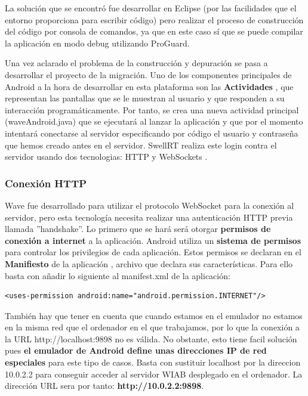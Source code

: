 	La solución que se encontró fue desarrollar en Eclipse (por las facilidades que el entorno proporciona para escribir código) pero realizar el proceso de construcción del código por consola de comandos, ya que en este caso sí que se puede compilar la aplicación en modo debug utilizando ProGuard.	  
	  
	  Una vez aclarado el problema de la construcción y depuración se pasa a desarrollar el proyecto de la migración. Uno de los componentes principales de Android a la hora de desarrollar en esta plataforma son las \textbf{Actividades} \cite{ref:android_activities}, que representan las pantallas que se le muestran al usuario y que responden a su interacción programáticamente. Por tanto, se crea una nueva actividad  principal (waveAndroid.java) que se ejecutará al lanzar la aplicación y que por el momento intentará conectarse al servidor especificando por código el usuario y contraseña que hemos creado antes en el servidor. SwellRT realiza este login contra el servidor usando dos tecnologias: HTTP \cite{ref:http_authentication} y WebSockets \cite{ref:webSocket_ref}.
	  
  
    		\subsubsection{Conexión HTTP}\label{sssec:conHttp}
	
	Wave fue desarrollado para utilizar el protocolo WebSocket para la conexión al servidor, pero esta tecnología necesita realizar una autenticación HTTP previa llamada ''handshake''. Lo primero que se hará será otorgar \textbf{permisos de conexión a internet} a la aplicación. Android utiliza un \textbf{sistema de permisos} \cite{ref:android_permissions} para controlar los privilegios de cada aplicación. Estos permisos se declaran en el \textbf{Manifiesto} de la aplicación \cite{ref:android_manifest}, archivo que declara sus características. Para ello basta con añadir lo siguiente al manifest.xml de la aplicación:
	  
	  \lstset{language=XML, breaklines=true, autogobble=true, basicstyle=\ttfamily\footnotesize}
	  \begin{lstlisting}[frame=single]
	  	<uses-permission android:name="android.permission.INTERNET"/>
	  \end{lstlisting}
	  
	  	 También hay que tener en cuenta que cuando estamos en el emulador no estamos en la misma red que el ordenador en el que trabajamos, por lo que la conexión a la URL http://localhost:9898 no es válida. No obstante, esto tiene facil solución pues \textbf{el emulador de Android define unas direcciones IP de red especiales} \cite{ref:android_netAddress} para este tipo de casos. Basta con sustituir localhost por la direccion 10.0.2.2 para conseguir acceder al servidor WIAB desplegado en el ordenador. La dirección URL sera por tanto: \textbf{http://10.0.2.2:9898}. 
	  
